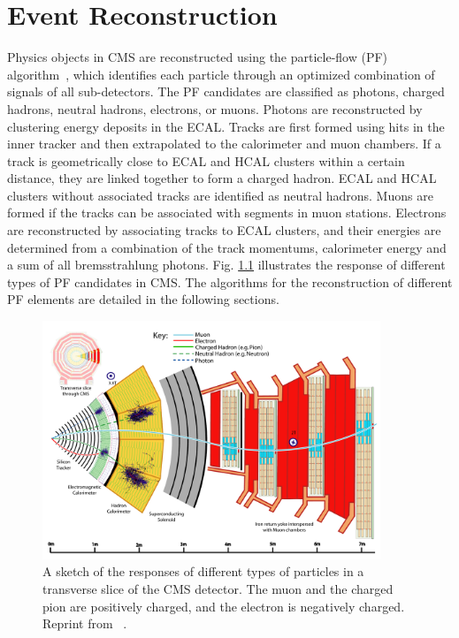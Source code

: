 \documentclass[thesis.tex]{subfiles}
\begin{document}
\chapter{Event Reconstruction}
\label{ch3}

Physics objects in CMS are reconstructed using the particle-flow (PF) algorithm~\cite{PARTICLEFLOW}, which identifies each particle through an optimized combination of signals of all sub-detectors.
The PF candidates are classified as photons, charged hadrons, neutral hadrons, electrons, or muons.
Photons are reconstructed by clustering energy deposits in the ECAL. 
Tracks are first formed using hits in the inner tracker and then extrapolated to the calorimeter and muon chambers.
If a track is geometrically close to ECAL and HCAL clusters within a certain distance, they are linked together to form a charged hadron.  
ECAL and HCAL clusters without associated tracks are identified as neutral hadrons. 
Muons are formed if the tracks can be associated with segments in muon stations. 
Electrons are reconstructed by associating tracks to ECAL clusters, and their energies are determined from a combination of the track momentums, calorimeter energy and a sum of all bremsstrahlung photons. 
Fig. \ref{fig:PF} illustrates the response of different types of PF candidates in CMS. 
The algorithms for the reconstruction of different PF elements are detailed in the following sections. 

\begin{figure}[htb]
	\includegraphics[width=0.9\textwidth]{Fig/ParticleFlow.pdf}
	\caption{A sketch of the responses of different types of particles in a transverse slice of the CMS detector. The muon and the charged pion are positively charged, and the electron is negatively charged. Reprint from ~\cite{PARTICLEFLOW}. }
	\label{fig:PF}
\end{figure}
\end{document}
